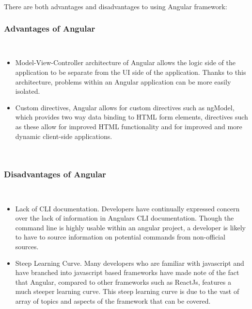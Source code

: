 There are both advantages and disadvantages to using Angular framework: \cite{advdis} \\

\subsubsection{Advantages of Angular} \\
\begin{itemize}
    \item Model-View-Controller architecture of Angular allows the logic side of the application to be separate from the UI side of the application. Thanks to this architecture, problems within an Angular application can be more easily isolated.
    \item Custom directives, Angular allows for custom directives such as ngModel, which provides two way data binding to HTML form elements, directives such as these allow for improved HTML functionality and for  improved and more dynamic client-side applications.
\end{itemize} \\

\subsubsection{Disadvantages of Angular}  \\
\begin{itemize}
    \item Lack of CLI documentation. Developers have continually expressed concern over the lack of information in Angulars CLI documentation. Though the command line is highly usable within an angular project, a developer is likely to have to source information on potential commands from non-official sources.
    \item Steep Learning Curve. Many developers who are familiar with javascript and have branched into javascript based frameworks have made note of the fact that Angular, compared to other frameworks such as ReactJs, features a much steeper learning curve. This steep learning curve is due to the vast of array of topics and aspects of the framework that can be covered.
\end{itemize}

